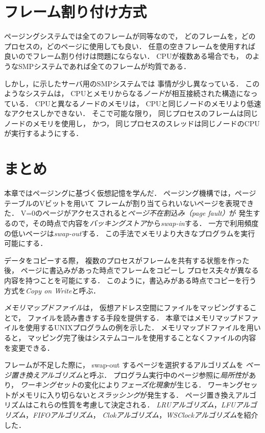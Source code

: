 \section{フレーム割り付け方式}\label{frameAllocation}
ページングシステムでは全てのフレームが同等なので，
どのフレームを，どのプロセスの，どのページに使用しても良い．
任意の空きフレームを使用すれば良いのでフレーム割り付けは問題にならない．
CPUが複数ある場合でも，
のようなSMPシステムであれば全てのフレームが均質である．

しかし，に示したサーバ用のSMPシステムでは
事情が少し異なっている．
このようなシステムは，
CPUとメモリからなる\emph{ノード}が相互接続された構造になっている．
CPUと異なるノードのメモリは，
CPUと同じノードのメモリより低速なアクセスしかできない．
そこで可能な限り，
同じプロセスのフレームは同じノードのメモリを使用し，
かつ，
同じプロセスのスレッドは同じノードのCPUが実行するようにする．

\section{まとめ}
本章ではページングに基づく仮想記憶を学んだ．
ページング機構では，ページテーブルのVビットを用いて
フレームが割り当てられいないページを表現できた．
V=0のページがアクセスされると\emph{ページ不在割込み（page fault）}が
発生するので，その時点で内容を\emph{バッキングストア}から\emph{swap-in}する．
一方で利用頻度の低いページは\emph{swap-out}する．
この手法でメモリより大きなプログラムを実行可能にする．

データをコピーする際，
複数のプロセスがフレームを共有する状態を作った後，
ページに書込みがあった時点でフレームをコピーし
プロセス夫々が異なる内容を持つことを可能にする．
このように，書込みがある時点でコピーを行う方式を\emph{Copy on Write}と呼ぶ．

\emph{メモリマップドファイル}は，
仮想アドレス空間にファイルをマッピングすることで，
ファイルを読み書きする手段を提供する．
本章ではメモリマップドファイルを使用するUNIXプログラムの例を示した．
メモリマップドファイルを用いると，
マッピング完了後はシステムコールを使用することなくファイルの内容を変更できる．

フレームが不足した際に，
swap-out するページを選択するアルゴリズムを
\emph{ページ置き換えアルゴリズム}と呼ぶ．
プログラム実行中のページ参照に\emph{局所性}があり，
\emph{ワーキングセット}の変化により\emph{フェーズ化現象}が生じる．
ワーキングセットがメモリに入り切らないと\emph{スラッシング}が発生する．
ページ置き換えアルゴリズムはこれらの性質を考慮して決定される．
\emph{LRUアルゴリズム}，\emph{LFUアルゴリズム}，\emph{FIFOアルゴリズム}，
\emph{Clokアルゴリズム}，\emph{WSClockアルゴリズム}を紹介した．

